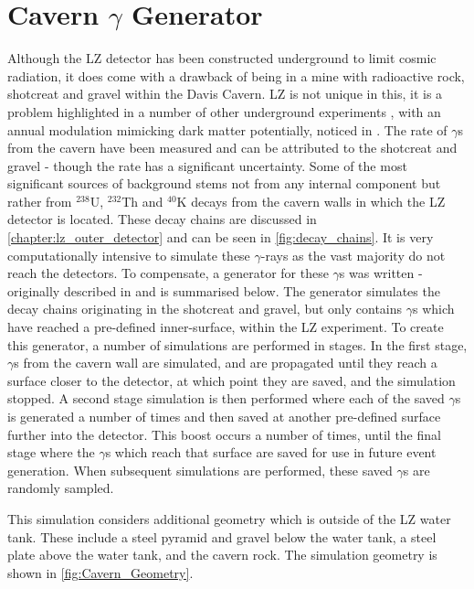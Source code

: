 \section{Cavern $\gamma$ Generator}
\label{sec:cavern_gamma_generator}

\par
Although the LZ detector has been constructed underground to limit cosmic radiation, it does come with a drawback of being in a mine with radioactive rock, shotcreat and gravel within the Davis Cavern.
LZ is not unique in this, it is a problem highlighted in a number of other underground experiments \cite{cavern_gamma_annual_modulation_CoGeNT_ref, cavern_gammas_in_Soudan_mine_ref}, with an annual modulation mimicking dark matter potentially, noticed in \cite{cavern_gamma_annual_modulation_CoGeNT_ref}.
The rate of $\gamma$s from the cavern have been measured and can be attributed to the shotcreat and gravel \cite{LZ_Gamma_Ray_Background_ref} - though the rate has a significant uncertainty.
Some of the most significant sources of background stems not from any internal component but rather from $^{238}$U, $^{232}$Th and $^{40}$K decays from the cavern walls in which the LZ detector is located.
These decay chains are discussed in \autoref{chapter:lz_outer_detector} and can be seen in \autoref{fig:decay_chains}.
It is very computationally intensive to simulate these $\gamma$-rays as the vast majority do not reach the detectors.
To compensate, a generator for these $\gamma$s was written - originally described in \cite{rg_generator_ref} and is summarised below.
The generator simulates the decay chains originating in the shotcreat and gravel, but only contains $\gamma$s which have reached a pre-defined inner-surface, within the LZ experiment.
To create this generator, a number of simulations are performed in stages.
In the first stage, $\gamma$s from the cavern wall are simulated, and are propagated until they reach a surface closer to the detector, at which point they are saved, and the simulation stopped.
A second stage simulation is then performed where each of the saved $\gamma$s is generated a number of times and then saved at another pre-defined surface further into the detector.
This boost occurs a number of times, until the final stage where the $\gamma$s which reach that surface are saved for use in future event generation.
When subsequent simulations are performed, these saved $\gamma$s are randomly sampled. 

\par
This simulation considers additional geometry which is outside of the LZ water tank.
These include a steel pyramid and gravel below the water tank, a steel plate above the water tank, and the cavern rock.
The simulation geometry is shown in \autoref{fig:Cavern_Geometry}.

